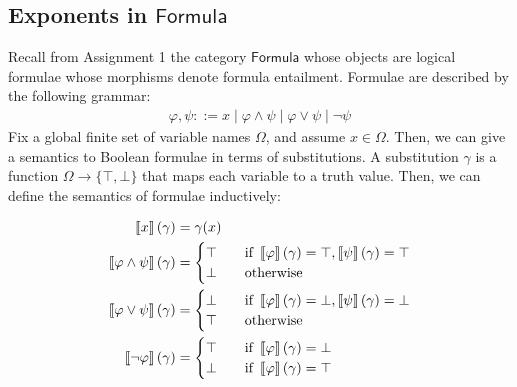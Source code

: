 
\subsection{Exponents in $\mathsf{Formula}$}
Recall from Assignment 1 the category $\mathsf{Formula}$ whose objects are
logical formulae whose morphisms denote formula entailment.
Formulae are described by the following grammar:
\begin{align}
  \varphi, \psi ::= x \mid \varphi \land \psi \mid \varphi \lor \psi \mid \neg \psi
\end{align}
Fix a global finite set of variable names $\Omega$, and assume $x \in \Omega$.
Then, we can give a semantics to Boolean formulae in terms of substitutions.
A
substitution $\gamma$ is a function $\Omega \to \{\top, \bot\}$ that maps each variable
to a truth value. Then, we can define the semantics of formulae inductively:

\begin{align*}
  \left\llbracket x \right\rrbracket(\gamma) &= \gamma(x)\\
  \left\llbracket \varphi \land \psi \right\rrbracket(\gamma) &= \begin{cases}
  \top \quad& \text{if } \left\llbracket \varphi \right\rrbracket(\gamma) = \top, \left\llbracket \psi \right\rrbracket(\gamma) = \top\\
  \bot \quad& \text{otherwise}
  \end{cases}\\
  \left\llbracket \varphi \lor \psi \right\rrbracket(\gamma) &= \begin{cases}
  \bot \quad& \text{if } \left\llbracket \varphi \right\rrbracket(\gamma) = \bot, \left\llbracket \psi \right\rrbracket(\gamma) = \bot\\
  \top \quad& \text{otherwise}
  \end{cases}\\
  \left\llbracket \neg \varphi \right\rrbracket(\gamma) &= \begin{cases}
  \top \quad& \text{if } \left\llbracket \varphi \right\rrbracket(\gamma) = \bot\\
  \bot \quad& \text{if } \left\llbracket \varphi \right\rrbracket(\gamma) = \top
  \end{cases}
\end{align*}

